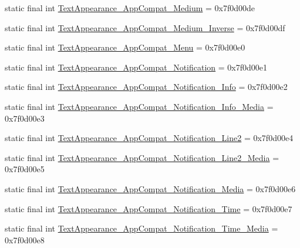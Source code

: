 \begin{DoxyCompactItemize}
\item 
static final int \mbox{\hyperlink{classandroid_1_1support_1_1v7_1_1appcompat_1_1R_1_1style_a772ffada512c435e31ffaebade3ed642}{Text\+Appearance\+\_\+\+App\+Compat\+\_\+\+Medium}} = 0x7f0d00de
\item 
static final int \mbox{\hyperlink{classandroid_1_1support_1_1v7_1_1appcompat_1_1R_1_1style_a8fa231cf7e54979201ef2a3fb3b336b0}{Text\+Appearance\+\_\+\+App\+Compat\+\_\+\+Medium\+\_\+\+Inverse}} = 0x7f0d00df
\item 
static final int \mbox{\hyperlink{classandroid_1_1support_1_1v7_1_1appcompat_1_1R_1_1style_a22812bea24f97e75e0f4a149ace3e8e9}{Text\+Appearance\+\_\+\+App\+Compat\+\_\+\+Menu}} = 0x7f0d00e0
\item 
static final int \mbox{\hyperlink{classandroid_1_1support_1_1v7_1_1appcompat_1_1R_1_1style_a4fbe0d02d0bafba021d7a2a3edcb7857}{Text\+Appearance\+\_\+\+App\+Compat\+\_\+\+Notification}} = 0x7f0d00e1
\item 
static final int \mbox{\hyperlink{classandroid_1_1support_1_1v7_1_1appcompat_1_1R_1_1style_a63018e1092cd1bcd1077973524e8c469}{Text\+Appearance\+\_\+\+App\+Compat\+\_\+\+Notification\+\_\+\+Info}} = 0x7f0d00e2
\item 
static final int \mbox{\hyperlink{classandroid_1_1support_1_1v7_1_1appcompat_1_1R_1_1style_a4ebe9cdf1be08132a905491a22e93372}{Text\+Appearance\+\_\+\+App\+Compat\+\_\+\+Notification\+\_\+\+Info\+\_\+\+Media}} = 0x7f0d00e3
\item 
static final int \mbox{\hyperlink{classandroid_1_1support_1_1v7_1_1appcompat_1_1R_1_1style_aa4ae9e982e57016f640bf942212ee97f}{Text\+Appearance\+\_\+\+App\+Compat\+\_\+\+Notification\+\_\+\+Line2}} = 0x7f0d00e4
\item 
static final int \mbox{\hyperlink{classandroid_1_1support_1_1v7_1_1appcompat_1_1R_1_1style_a83ded7208b1c3eee6a417a65173a6008}{Text\+Appearance\+\_\+\+App\+Compat\+\_\+\+Notification\+\_\+\+Line2\+\_\+\+Media}} = 0x7f0d00e5
\item 
static final int \mbox{\hyperlink{classandroid_1_1support_1_1v7_1_1appcompat_1_1R_1_1style_a974fcf15de42850f2005ba4edd34378e}{Text\+Appearance\+\_\+\+App\+Compat\+\_\+\+Notification\+\_\+\+Media}} = 0x7f0d00e6
\item 
static final int \mbox{\hyperlink{classandroid_1_1support_1_1v7_1_1appcompat_1_1R_1_1style_aca07581dc57dd9865b2f8ea80bca66be}{Text\+Appearance\+\_\+\+App\+Compat\+\_\+\+Notification\+\_\+\+Time}} = 0x7f0d00e7
\item 
static final int \mbox{\hyperlink{classandroid_1_1support_1_1v7_1_1appcompat_1_1R_1_1style_a653a5eb1a443fa7df619ae8bb8784c7d}{Text\+Appearance\+\_\+\+App\+Compat\+\_\+\+Notification\+\_\+\+Time\+\_\+\+Media}} = 0x7f0d00e8

\end{DoxyCompactItemize}
